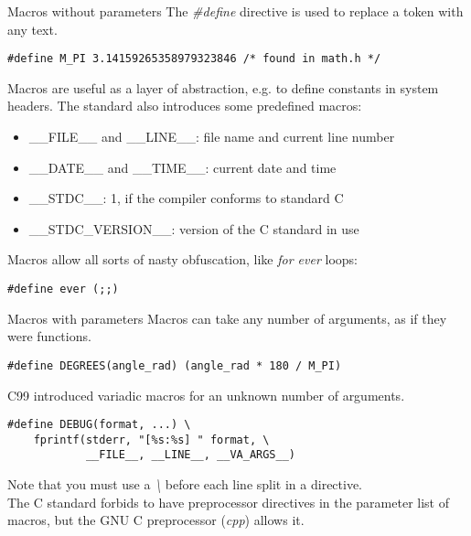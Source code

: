 \begin{frame}[fragile = singleslide]{Macros without parameters}
	The \textit{\#define} directive is used to replace a token with any text.
	\begin{lstlisting}[numbers=none]
#define M_PI 3.14159265358979323846	/* found in math.h */
\end{lstlisting}
	\bigskip
	Macros are useful as a layer of abstraction, e.g. to define constants in system headers.
	The standard also introduces some predefined macros:
	\begin{itemize}
		\item \_\_FILE\_\_ and \_\_LINE\_\_: file name and current line number
		\item \_\_DATE\_\_ and \_\_TIME\_\_: current date and time
		\item \_\_STDC\_\_: 1, if the compiler conforms to standard C
		\item \_\_STDC\_VERSION\_\_: version of the C standard in use
	\end{itemize}
	\bigskip
	Macros allow all sorts of nasty obfuscation, like \textit{for ever} loops:
	\begin{lstlisting}[numbers=none]
#define ever (;;)
\end{lstlisting}
\end{frame}

\begin{frame}[fragile = singleslide]{Macros with parameters}
	Macros can take any number of arguments, as if they were functions.
	\begin{lstlisting}[numbers=none]
#define DEGREES(angle_rad) (angle_rad * 180 / M_PI)
\end{lstlisting}
	\bigskip
	C99 introduced variadic macros for an unknown number of arguments.
	\begin{lstlisting}[numbers=none]
#define DEBUG(format, ...) \
	fprintf(stderr, "[%s:%s] " format, \
			__FILE__, __LINE__, __VA_ARGS__)
\end{lstlisting}
	\bigskip
	Note that you must use a \textit{\textbackslash} before each line split in a directive.\\
	\bigskip
	The C standard forbids to have preprocessor directives in the parameter list
	of macros, but the GNU C preprocessor (\textit{cpp}) allows it.
\end{frame}

